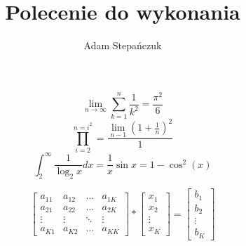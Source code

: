 \documentclass[a4paper,12pt]{article}
\title{Polecenie do wykonania}
\author{Adam Stepańczuk}
\begin{document}
\maketitle


$$\lim_{n \to \infty}\sum_{k=1}^n\frac{1}{k^2}=\frac{\pi^2}{6}$$
$$\prod_{i=2}^{n=i^2}=\frac{\lim_{n-1}\left(1+\frac{1}{n}\right)^2}{1}$$
$$\int_{2}^\infty \frac{1}{\log_{2}x}dx=\frac{1}{x}\sin{x}=1-\cos^2{(x)}$$

\begin{equation}
\left[\begin{array}{cccc}
a_{11} & a_{12} & \ldots & a_{1K} \\
a_{21} & a_{22} & \ldots & a_{2K} \\
\vdots & \vdots & \ddots & \vdots \\
a_{K1} & a_{K2} & \ldots & a_{KK} 
\end{array} \right]
*\left[\begin{array}{c}
x_{1} \\ x_{2} \\ \vdots \\ x_{K}
\end{array} \right]
=\left[\begin{array}{c}
b_{1} \\ b_{2} \\ \vdots \\ b_{K}
\end{array} \right]

\end{equation}
\end{document}
